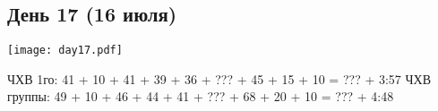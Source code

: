 \graphicspath{{Pictures/Chapter5/Day17}}


\subsection{День 17 (16 июля)}\label{subsec:Day17}
    \parbox[c]{\textwidth}{%
        \texttt{[image: day17.pdf]}\label{fig:Day17_map}%
    }
    \vspace{0.8cm}
    










ЧХВ 1го: 41 + 10 + 41 + 39 + 36 + ??? + 45 + 15 + 10 = ??? + 3:57
ЧХВ группы: 49 + 10 + 46 + 44 + 41 + ??? + 68 + 20 + 10 = ??? + 4:48


    \FloatBarrier
